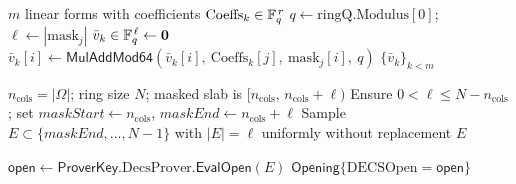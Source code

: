\begin{algorithm}[H]
\caption{\textsf{LVCS.EvalInitMany}$(\mathrm{ringQ},\ \mathsf{ProverKey},\ \{\mathrm{Coeffs}_k\}_{k<m})\to \{\bar v_k\}_{k<m}$ \quad \emph{(Prover)}}
\begin{algorithmic}[1]
\Require $m$ linear forms with coefficients $\mathrm{Coeffs}_k\in\mathbb{F}_q^{\,r}$
\State $q\gets \mathrm{ringQ}.\text{Modulus}[0]$;\; $\ell\gets |\mathrm{mask}_j|$
  \State $\bar v_k\in\mathbb{F}_q^{\,\ell}\gets \mathbf{0}$
      \State $\bar v_k[i]\gets \textsf{MulAddMod64}(\bar v_k[i],\ \mathrm{Coeffs}_k[j],\ \mathrm{mask}_j[i],\ q)$
    \EndFor
  \EndFor
\EndFor
\State \Return $\{\bar v_k\}_{k<m}$
\end{algorithmic}
\end{algorithm}

\begin{algorithm}[H]
\caption{\textsf{LVCS.ChooseE}$(\ell,\ n_{\mathrm{cols}})\to E$ \quad \emph{(Verifier)}}
\begin{algorithmic}[1]
\Require $n_{\mathrm{cols}}=|\Omega|$; ring size $N$; masked slab is $[n_{\mathrm{cols}},\, n_{\mathrm{cols}}+\ell)$
\State Ensure $0<\ell\le N-n_{\mathrm{cols}}$;\; set $maskStart\gets n_{\mathrm{cols}}$, $maskEnd\gets n_{\mathrm{cols}}+\ell$
\State Sample $E\subset \{maskEnd,\dots,N-1\}$ with $|E|=\ell$ uniformly without replacement
\State \Return $E$
\end{algorithmic}
\end{algorithm}

\begin{algorithm}[H]
\caption{\textsf{LVCS.EvalFinish}$(\mathsf{ProverKey},\ E)\to \mathsf{Opening}$ \quad \emph{(Prover)}}
\begin{algorithmic}[1]
\State $\mathsf{open}\gets \mathsf{ProverKey}.\mathrm{DecsProver}.\textsf{EvalOpen}(E)$
\State \Return $\mathsf{Opening}\{\mathrm{DECSOpen}=\mathsf{open}\}$
\end{algorithmic}
\end{algorithm}

